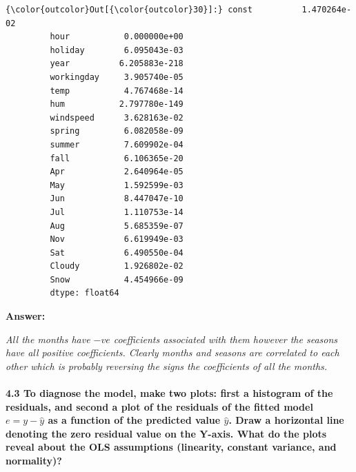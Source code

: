 \documentclass[11pt]{article}
\begin{document}
\begin{Verbatim}[commandchars=\\\{\}]
{\color{outcolor}Out[{\color{outcolor}30}]:} const          1.470264e-02
         hour           0.000000e+00
         holiday        6.095043e-03
         year          6.205883e-218
         workingday     3.905740e-05
         temp           4.767468e-14
         hum           2.797780e-149
         windspeed      3.628163e-02
         spring         6.082058e-09
         summer         7.609902e-04
         fall           6.106365e-20
         Apr            2.640964e-05
         May            1.592599e-03
         Jun            8.447047e-10
         Jul            1.110753e-14
         Aug            5.685359e-07
         Nov            6.619949e-03
         Sat            6.490550e-04
         Cloudy         1.926802e-02
         Snow           4.454966e-09
         dtype: float64
\end{Verbatim}
            
    \textbf{Answer:}

\emph{All the months have \(-ve\) coefficients associated with them
however the seasons have all positive coefficients. Clearly months and
seasons are correlated to each other which is probably reversing the
signs the coefficients of all the months.}

    \paragraph{\texorpdfstring{\textbf{4.3} To diagnose the model, make two
plots: first a histogram of the residuals, and second a plot of the
residuals of the fitted model \({e} = y - \hat{y}\) as a function of the
predicted value \(\hat{y}\). Draw a horizontal line denoting the zero
residual value on the Y-axis. What do the plots reveal about the OLS
assumptions (linearity, constant variance, and
normality)?}{4.3 To diagnose the model, make two plots: first a histogram of the residuals, and second a plot of the residuals of the fitted model \{e\} = y - \textbackslash{}hat\{y\} as a function of the predicted value \textbackslash{}hat\{y\}. Draw a horizontal line denoting the zero residual value on the Y-axis. What do the plots reveal about the OLS assumptions (linearity, constant variance, and normality)?}}\label{to-diagnose-the-model-make-two-plots-first-a-histogram-of-the-residuals-and-second-a-plot-of-the-residuals-of-the-fitted-model-e-y---haty-as-a-function-of-the-predicted-value-haty.-draw-a-horizontal-line-denoting-the-zero-residual-value-on-the-y-axis.-what-do-the-plots-reveal-about-the-ols-assumptions-linearity-constant-variance-and-normality}
\end{document}
